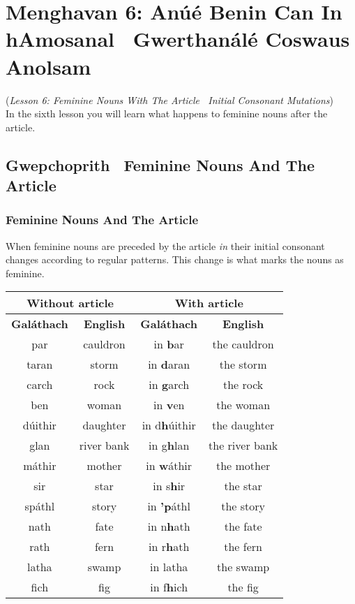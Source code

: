 \section{Menghavan 6: An\'{u}\'{e} Benin Can In hAmosanal \textendash\ Gwerthan\'{a}l\'{e} Coswaus Anolsam}
(\textit{Lesson 6: Feminine Nouns With The Article \textendash\ Initial Consonant Mutations})\\
In the sixth lesson you will learn what happens to feminine nouns after the article.

\subsection{Gwepchoprith \textendash\ Feminine Nouns And The Article}
\subsubsection{Feminine Nouns And The Article}

When feminine nouns are preceded by the article \textit{in} their initial consonant changes according to regular patterns. This change is what marks the nouns as feminine.
\begin{table}[H]
\centering
\begin{tabular}{cccc}
  \toprule
  \multicolumn{2}{c}{\textbf{Without article}} & \multicolumn{2}{c}{\textbf{With article}}\\
  \midrule
  \textbf{Gal\'{a}thach} & \textbf{English} & \textbf{Gal\'{a}thach} & \textbf{English}\\
  \cmidrule(lr){1-1}\cmidrule(lr){2-2}\cmidrule(lr){3-3}\cmidrule(lr){4-4}
  par & cauldron & in \textbf{b}ar & the cauldron\\
  taran & storm & in \textbf{d}aran & the storm\\
  carch & rock & in \textbf{g}arch & the rock\\
  ben & woman & in \textbf{v}en & the woman\\
  d\'{u}ithir & daughter & in d\textbf{h}\'{u}ithir & the daughter\\
  glan & river bank & in g\textbf{h}lan & the river bank\\
  m\'{a}thir & mother & in \textbf{w}\'{a}thir & the mother\\
  sir & star & in s\textbf{h}ir & the star\\
  sp\'{a}thl & story & in \textbf{'p}\'{a}thl & the story\\
  nath & fate & in n\textbf{h}ath & the fate\\
  rath & fern & in r\textbf{h}ath & the fern\\
  latha & swamp & in latha & the swamp\\
  fich & fig & in f\textbf{h}ich & the fig\\
  \bottomrule
\end{tabular}
\label{examples_article_feminine_nouns}
\end{table}

